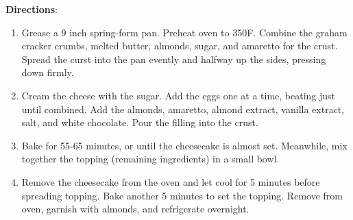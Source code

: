 \documentclass[11pt, twoside, openany]{book}
\begin{document}
\begin{minipage}[t]{\linewidth}
\textbf{Directions}:
\vspace{-3mm}\begin{enumerate}\setlength\itemsep{-1mm}
\item Grease a 9 inch spring-form pan. Preheat oven to 350F. Combine the graham cracker crumbs, melted butter, almonds, sugar, and amaretto for the crust. Spread the curst into the pan evently and halfway up the sides, pressing down firmly.
\item Cream the cheese with the sugar. Add the eggs one at a time, beating just until combined. Add the almonds, amaretto, almond extract, vanilla extract, salt, and white chocolate. Pour the filling into the crust.
\item Bake for 55-65 minutes, or until the cheesecake is almost set. Meanwhile, mix together the topping (remaining ingredients) in a small bowl. 
\item Remove the cheesecake from the oven and let cool for 5 minutes before spreading topping. Bake another 5 minutes to set the topping. Remove from oven, garnish with almonds, and refrigerate overnight.
\end{enumerate}
\end{minipage}\vspace{8mm}
\end{document}
